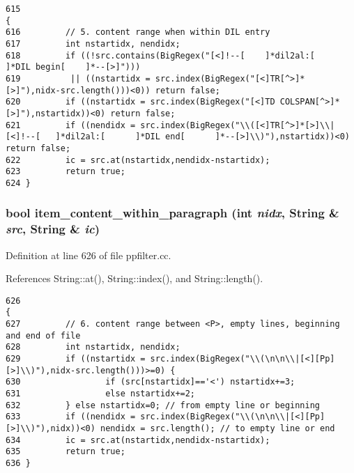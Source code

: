 \footnotesize\begin{verbatim}615                                                                         {
616         // 5. content range when within DIL entry
617         int nstartidx, nendidx;
618         if ((!src.contains(BigRegex("[<]!--[    ]*dil2al:[      ]*DIL begin[    ]*--[>]")))
619          || ((nstartidx = src.index(BigRegex("[<]TR[^>]*[>]"),nidx-src.length()))<0)) return false;
620         if ((nstartidx = src.index(BigRegex("[<]TD COLSPAN[^>]*[>]"),nstartidx))<0) return false;
621         if ((nendidx = src.index(BigRegex("\\([<]TR[^>]*[>]\\|[<]!--[   ]*dil2al:[      ]*DIL end[      ]*--[>]\\)"),nstartidx))<0) return false;
622         ic = src.at(nstartidx,nendidx-nstartidx);
623         return true;
624 }
\end{verbatim}\normalsize 
{}
\subsubsection{\setlength{\rightskip}{0pt plus 5cm}bool item\_\-content\_\-within\_\-paragraph (int {\em nidx}, {\bf String} \& {\em src}, {\bf String} \& {\em ic})}\label{ppfilter_8cc_a14}




Definition at line 626 of file ppfilter.cc.

References String::at(), String::index(), and String::length().



\footnotesize\begin{verbatim}626                                                                         {
627         // 6. content range between <P>, empty lines, beginning and end of file
628         int nstartidx, nendidx;
629         if ((nstartidx = src.index(BigRegex("\\(\n\n\\|[<][Pp][>]\\)"),nidx-src.length()))>=0) {
630                 if (src[nstartidx]=='<') nstartidx+=3;
631                 else nstartidx+=2;
632         } else nstartidx=0; // from empty line or beginning
633         if ((nendidx = src.index(BigRegex("\\(\n\n\\|[<][Pp][>]\\)"),nidx))<0) nendidx = src.length(); // to empty line or end
634         ic = src.at(nstartidx,nendidx-nstartidx);
635         return true;
636 }
\end{verbatim}\normalsize 
{}
